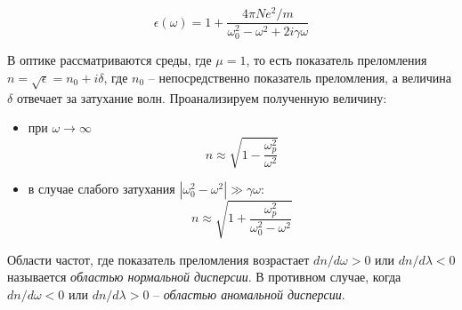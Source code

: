 \begin{equation}
    \epsilon (\omega) = 1 + \frac{4 \pi N e^2 / m}{\omega_0^2 - \omega^2 + 2 i \gamma \omega}
\end{equation}

В оптике рассматриваются среды, где $\mu = 1$, то есть показатель преломления $n = \sqrt{\epsilon} = n_0 + i \delta$, где $n_0$ -- непосредственно показатель преломления, а величина $\delta$ отвечает за затухание волн. Проанализируем полученную величину:

\begin{itemize}
    \item при $\omega \to \infty$
    \begin{equation}
        n \approx \sqrt{1 - \frac{\omega_p^2}{\omega^2}}
    \end{equation}
    \item в случае слабого затухания $| \omega_0^2 - \omega^2 | \gg \gamma \omega$:
    \begin{equation}
        n \approx \sqrt{1 + \frac{\omega_p^2}{\omega_0^2 - \omega^2}}
    \end{equation}
\end{itemize}

Области частот, где показатель преломления возрастает $d n / d \omega > 0$ или $d n / d \lambda < 0$ называется \textit{областью нормальной дисперсии}. В противном случае, когда $d n / d \omega < 0$ или $d n / d \lambda > 0$ -- \textit{областью аномальной дисперсии}.